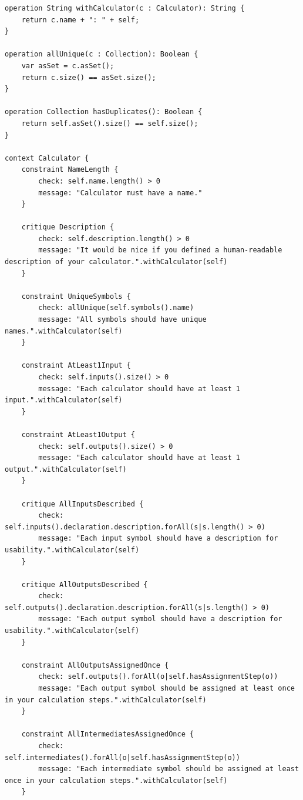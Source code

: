 \documentclass[11pt,fleqn]{article}
\begin{document}
\begin{lstlisting}[caption={Constraints and Critiques},label={lst:constraints-and-critiques}]
operation String withCalculator(c : Calculator): String {
    return c.name + ": " + self;
}

operation allUnique(c : Collection): Boolean {
    var asSet = c.asSet();
    return c.size() == asSet.size();
}

operation Collection hasDuplicates(): Boolean {
    return self.asSet().size() == self.size();
}

context Calculator {
    constraint NameLength {
        check: self.name.length() > 0
        message: "Calculator must have a name."
    }

    critique Description {
        check: self.description.length() > 0
        message: "It would be nice if you defined a human-readable description of your calculator.".withCalculator(self)
    }

    constraint UniqueSymbols {
        check: allUnique(self.symbols().name)
        message: "All symbols should have unique names.".withCalculator(self)
    }

    constraint AtLeast1Input {
        check: self.inputs().size() > 0
        message: "Each calculator should have at least 1 input.".withCalculator(self)
    }

    constraint AtLeast1Output {
        check: self.outputs().size() > 0
        message: "Each calculator should have at least 1 output.".withCalculator(self)
    }

    critique AllInputsDescribed {
        check: self.inputs().declaration.description.forAll(s|s.length() > 0)
        message: "Each input symbol should have a description for usability.".withCalculator(self)
    }

    critique AllOutputsDescribed {
        check: self.outputs().declaration.description.forAll(s|s.length() > 0)
        message: "Each output symbol should have a description for usability.".withCalculator(self)
    }

    constraint AllOutputsAssignedOnce {
        check: self.outputs().forAll(o|self.hasAssignmentStep(o))
        message: "Each output symbol should be assigned at least once in your calculation steps.".withCalculator(self)
    }

    constraint AllIntermediatesAssignedOnce {
        check: self.intermediates().forAll(o|self.hasAssignmentStep(o))
        message: "Each intermediate symbol should be assigned at least once in your calculation steps.".withCalculator(self)
    }


\end{lstlisting}
\end{document}
